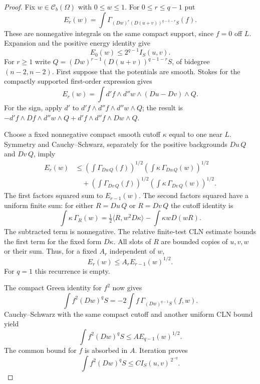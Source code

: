 \documentclass[11pt,a4paper]{article}
\numberwithin{equation}{section}
\theoremstyle{definition}
\theoremstyle{remark}
\newcommand{\Cb}{\mathcal C_b}
\begin{document}
\begin{proof}
Fix $w\in\Cb(\Omega)$ with $0\leq w\leq1$. For $0\leq r\leq q-1$ put
\[
 E_r(w)=\int\Gamma_{(Dw)^r(D(u+v))^{q-1-r}S}(f).
\]
These are nonnegative integrals on the same compact support, since
$f=0$ off $L$. Expansion and the positive energy identity give
\begin{equation}
 \label{eq:r3-E-zero}
 E_0(w)\leq2^{q-1}I_S(u,v).
\end{equation}
For $r\geq1$ write
$Q=(Dw)^{r-1}(D(u+v))^{q-1-r}S$, of bidegree $(n-2,n-2)$.
First suppose that the potentials are smooth. Stokes for the
compactly supported first-order expression gives
\begin{equation}
 \label{eq:r3-E-transfer}
 E_r(w)=\int d'f\wedge d''w\wedge(Du-Dv)\wedge Q.
\end{equation}
For the sign, apply $d'$ to
$d'f\wedge d''f\wedge d''w\wedge Q$; the result is
$-d'f\wedge Df\wedge d''w\wedge Q+
d'f\wedge d''f\wedge Dw\wedge Q$.

Choose a fixed nonnegative compact smooth cutoff $\kappa$ equal
to one near $L$. Symmetry and Cauchy--Schwarz, separately for
the positive backgrounds $Du\,Q$ and $Dv\,Q$, imply
\begin{align*}
 E_r(w)
 &\leq\left(\int\Gamma_{Du\,Q}(f)\right)^{1/2}
       \left(\int\kappa\,\Gamma_{Du\,Q}(w)\right)^{1/2}\\
 &\quad+\left(\int\Gamma_{Dv\,Q}(f)\right)^{1/2}
       \left(\int\kappa\,\Gamma_{Dv\,Q}(w)\right)^{1/2}.
\end{align*}
The first factors squared sum to $E_{r-1}(w)$. The second factors
squared have a uniform finite sum: for either $R=Du\,Q$ or
$R=Dv\,Q$ the cutoff identity is
\[
 \int\kappa\,\Gamma_R(w)
  =\tfrac12\langle R,w^2D\kappa\rangle-\int\kappa wD(wR).
\]
The subtracted term is nonnegative. The relative finite-test CLN
estimate bounds the first term for the fixed form $D\kappa$.
All slots of $R$ are bounded copies of $u,v,w$ or their sum.
Thus, for a fixed $A_r$ independent of $w$,
\begin{equation}
 \label{eq:r3-E-recurrence}
 E_r(w)\leq A_r E_{r-1}(w)^{1/2}.
\end{equation}
For $q=1$ this recurrence is empty.

The compact Green identity for $f^2$ now gives
\[
 \int f^2(Dw)^qS
       =-2\int f\,\Gamma_{(Dw)^{q-1}S}(f,w).
\]
Cauchy--Schwarz with the same compact cutoff and another uniform
CLN bound yield
\begin{equation}
 \label{eq:r3-E-square-final}
 \int f^2(Dw)^qS\leq A E_{q-1}(w)^{1/2}.
\end{equation}
The common bound for $f$ is absorbed in $A$. Iteration proves
\begin{equation}
 \label{eq:r3-all-degree-square-control}
 \int f^2(Dw)^qS\leq C I_S(u,v)^{\,2^{-q}}.
\end{equation}


\end{proof}
\end{document}
